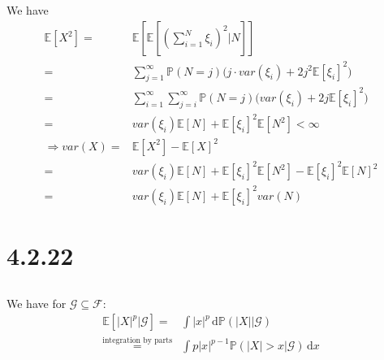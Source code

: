 \documentclass[11pt,a4paper]{ctexart}
\numberwithin{equation}{section}%
\begin{document}
\subsection{}
We have
\begin{align*}
    \mathbb{E}\left[ X^2 \right] =& \mathbb{E}\left[ \mathbb{E}\left[ \left( \sum_{i=1}^N \xi _i \right)^2 |N \right]  \right]\\
    =& \sum_{j=1}^\infty \mathbb{P}\left( N=j \right)  \big(j\cdot var(\xi _i) + 2j^2 \mathbb{E}\left[ \xi _i \right] ^2\big)\\
    =& \sum_{i=1}^\infty\sum_{j=i}^\infty \mathbb{P}\left( N=j  \right) \big(var(\xi _i) + 2j\mathbb{E}\left[ \xi _i \right] ^2\big) \\
    =& var(\xi _i)\mathbb{E}\left[ N \right] + \mathbb{E}\left[ \xi _i \right]^2 \mathbb{E}\left[ N^2 \right]  <\infty\\
     \Rightarrow var(X)=& \mathbb{E}\left[ X^2 \right] - \mathbb{E}\left[ X \right] ^2\\
     =& var(\xi _i)\mathbb{E}\left[ N \right] + \mathbb{E}\left[ \xi _i \right]^2 \mathbb{E}\left[ N^2 \right] - \mathbb{E}\left[ \xi _i \right]^2 \mathbb{E}\left[ N \right]^2\\
     =&   var(\xi _i)\mathbb{E}\left[ N \right] + \mathbb{E}\left[ \xi _i \right]^2var(N)
\end{align*}

\section{4.2.22}

\subsection{}
We have for $ \mathcal{G}\subseteq\mathcal{F} $:
\begin{align*}
    \mathbb{E}\left[ \left\vert X \right\vert ^p | \mathcal{G} \right]  =& \int \left\vert x \right\vert ^p  \,\mathrm{d}\mathbb{P}\left( \left\vert X \right\vert |\mathcal{G} \right) \\
    \mathop{ = }\limits^{\text{integration by parts}} & \int p\left\vert x \right\vert ^{p-1} \mathbb{P}\left( \left\vert X \right\vert >x|\mathcal{G} \right) \,\mathrm{d}x
\end{align*}
\end{document}
